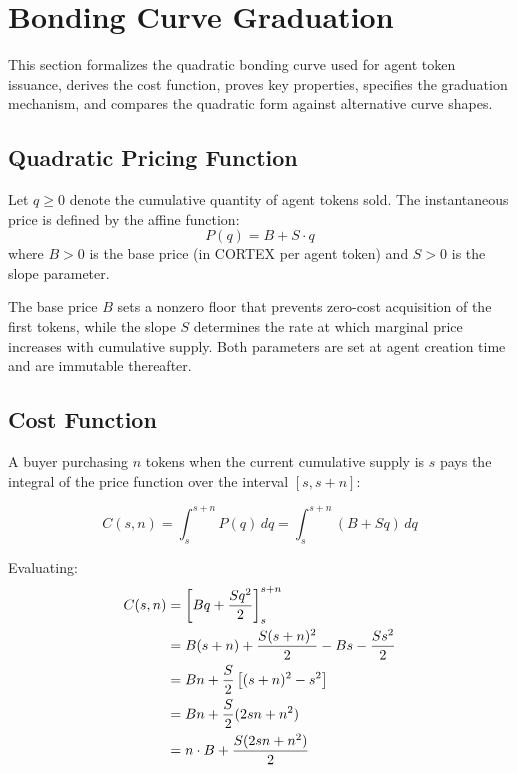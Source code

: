 \section{Bonding Curve Graduation}
\label{sec:bonding-curve}

This section formalizes the quadratic bonding curve used for agent token
issuance, derives the cost function, proves key properties, specifies the
graduation mechanism, and compares the quadratic form against alternative curve
shapes.

\subsection{Quadratic Pricing Function}
\label{subsec:pricing}

\begin{definition}
\label{def:bc-price}
Let $q \geq 0$ denote the cumulative quantity of agent tokens sold. The
instantaneous price is defined by the affine function:
\begin{equation}
  P(q) = B + S \cdot q
  \label{eq:price-function}
\end{equation}
where $B > 0$ is the base price (in CORTEX per agent token) and $S > 0$ is
the slope parameter.
\end{definition}

The base price $B$ sets a nonzero floor that prevents zero-cost acquisition of
the first tokens, while the slope $S$ determines the rate at which marginal
price increases with cumulative supply. Both parameters are set at agent
creation time and are immutable thereafter.

\subsection{Cost Function}
\label{subsec:cost}

A buyer purchasing $n$ tokens when the current cumulative supply is $s$ pays
the integral of the price function over the interval $[s, s+n]$:

\begin{equation}
  C(s, n) = \int_{s}^{s+n} P(q) \, dq = \int_{s}^{s+n} (B + Sq) \, dq
  \label{eq:cost-integral}
\end{equation}

Evaluating:
\begin{align}
  C(s, n) &= \left[ Bq + \frac{S q^2}{2} \right]_{s}^{s+n} \notag \\
  &= B(s+n) + \frac{S(s+n)^2}{2} - Bs - \frac{Ss^2}{2} \notag \\
  &= Bn + \frac{S}{2}\left[(s+n)^2 - s^2\right] \notag \\
  &= Bn + \frac{S}{2}(2sn + n^2) \notag \\
  &= n \cdot B + \frac{S(2sn + n^2)}{2}
  \label{eq:cost-closed}
\end{align}

